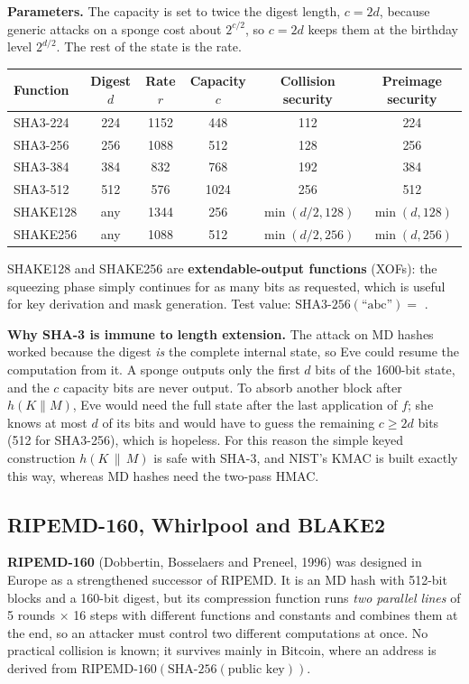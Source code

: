 \textbf{Parameters.} The capacity is set to twice the digest length, $c = 2d$, because generic attacks on a sponge cost about $2^{c/2}$, so $c = 2d$ keeps them at the birthday level $2^{d/2}$. The rest of the state is the rate.
\begin{center}\small
\begin{tabular}{@{}lccccc@{}}
\toprule
Function & Digest $d$ & Rate $r$ & Capacity $c$ & Collision security & Preimage security\\
\midrule
SHA3-224 & 224 & 1152 & 448 & 112 & 224\\
SHA3-256 & 256 & 1088 & 512 & 128 & 256\\
SHA3-384 & 384 & 832 & 768 & 192 & 384\\
SHA3-512 & 512 & 576 & 1024 & 256 & 512\\
SHAKE128 & any & 1344 & 256 & $\min(d/2, 128)$ & $\min(d, 128)$\\
SHAKE256 & any & 1088 & 512 & $\min(d/2, 256)$ & $\min(d, 256)$\\
\bottomrule
\end{tabular}
\end{center}
SHAKE128 and SHAKE256 are \textbf{extendable-output functions} (XOFs): the squeezing phase simply continues for as many bits as requested, which is useful for key derivation and mask generation. Test value: $\mathrm{SHA3\text{-}256}(\text{``abc''}) = $ .

\textbf{Why SHA-3 is immune to length extension.} The attack on MD hashes worked because the digest \emph{is} the complete internal state, so Eve could resume the computation from it. A sponge outputs only the first $d$ bits of the 1600-bit state, and the $c$ capacity bits are never output. To absorb another block after $h(K \| M)$, Eve would need the full state after the last application of $f$; she knows at most $d$ of its bits and would have to guess the remaining $c \ge 2d$ bits (512 for SHA3-256), which is hopeless. For this reason the simple keyed construction $h(K \,\|\, M)$ is safe with SHA-3, and NIST's KMAC is built exactly this way, whereas MD hashes need the two-pass HMAC.

\subsection{RIPEMD-160, Whirlpool and BLAKE2}
\textbf{RIPEMD-160} (Dobbertin, Bosselaers and Preneel, 1996) was designed in Europe as a strengthened successor of RIPEMD. It is an MD hash with 512-bit blocks and a 160-bit digest, but its compression function runs \emph{two parallel lines} of 5 rounds $\times$ 16 steps with different functions and constants and combines them at the end, so an attacker must control two different computations at once. No practical collision is known; it survives mainly in Bitcoin, where an address is derived from $\mathrm{RIPEMD\text{-}160}(\mathrm{SHA\text{-}256}(\text{public key}))$.

